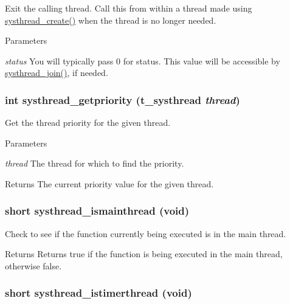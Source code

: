 Exit the calling thread. Call this from within a thread made using \hyperlink{group__threading_ga7217fa33811a5ed35b970f504b4e4a79}{systhread\_\-create()} when the thread is no longer needed.


\begin{DoxyParams}{Parameters}
\item[{\em status}]You will typically pass 0 for status. This value will be accessible by \hyperlink{group__threading_gaac24a9db0d7af2343501a4e762d2ce85}{systhread\_\-join()}, if needed. \end{DoxyParams}
\hypertarget{group__threading_gaf073584f030cffc3a823601173803a95}{
\subsubsection[{systhread\_\-getpriority}]{\setlength{\rightskip}{0pt plus 5cm}int systhread\_\-getpriority ({\bf t\_\-systhread} {\em thread})}}
\label{group__threading_gaf073584f030cffc3a823601173803a95}


Get the thread priority for the given thread. 
\begin{DoxyParams}{Parameters}
\item[{\em thread}]The thread for which to find the priority. \end{DoxyParams}
\begin{DoxyReturn}{Returns}
The current priority value for the given thread. 
\end{DoxyReturn}
\hypertarget{group__threading_ga7ed1192e20bccddec517591b4a5f0f91}{
\subsubsection[{systhread\_\-ismainthread}]{\setlength{\rightskip}{0pt plus 5cm}short systhread\_\-ismainthread (void)}}
\label{group__threading_ga7ed1192e20bccddec517591b4a5f0f91}


Check to see if the function currently being executed is in the main thread. \begin{DoxyReturn}{Returns}
Returns true if the function is being executed in the main thread, otherwise false. 
\end{DoxyReturn}
\hypertarget{group__threading_ga9bc306a6b164f705e55d1612c5ccfb78}{
\subsubsection[{systhread\_\-istimerthread}]{\setlength{\rightskip}{0pt plus 5cm}short systhread\_\-istimerthread (void)}}
\label{group__threading_ga9bc306a6b164f705e55d1612c5ccfb78}


